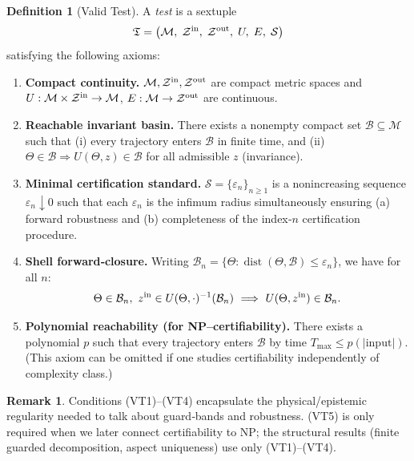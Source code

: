 \documentclass[12pt]{article}
\theoremstyle{definition}
\newtheorem{definition}{Definition}[section]
\newtheorem{remark}{Remark}[section]
\theoremstyle{plain}
\begin{document}
\begin{definition}[Valid Test]
\label{def:valid-test}
A \emph{test} is a sextuple
\[
  \mathfrak T = \bigl(\mathcal M,\;\mathcal Z^{\rm in},\;\mathcal Z^{\rm out},\;U,\;E,\;\mathcal S\bigr)
\]
satisfying the following axioms:

\begin{enumerate}[label=(VT\arabic*)]
  \item \textbf{Compact continuity.} 
        $\mathcal M,\mathcal Z^{\rm in},\mathcal Z^{\rm out}$ are compact metric spaces and 
        $U:\mathcal M\times\mathcal Z^{\rm in}\to\mathcal M$, 
        $E:\mathcal M\to\mathcal Z^{\rm out}$ are continuous.

  \item \textbf{Reachable invariant basin.}
        There exists a nonempty compact set $\mathcal B\subseteq\mathcal M$ such that
        (i) every trajectory enters $\mathcal B$ in finite time, and
        (ii) $\Theta\in\mathcal B \Rightarrow U(\Theta,z)\in\mathcal B$ for all admissible $z$ (invariance).

  \item \textbf{Minimal certification standard.}
        $\mathcal S=\{\varepsilon_n\}_{n\ge1}$ is a nonincreasing sequence $\varepsilon_n\downarrow0$ such that each
        $\varepsilon_n$ is the infimum radius simultaneously ensuring (a) forward robustness and (b) completeness of the index‑$n$ certification procedure.

  \item \textbf{Shell forward‑closure.}
        Writing $\mathcal B_n=\{\Theta:\operatorname{dist}(\Theta,\mathcal B)\le\varepsilon_n\}$,
        we have for all $n$:
        \[
          \Theta\in\mathcal B_n,\ z^{\rm in}\in U(\Theta,\cdot)^{-1}(\mathcal B_n)
          \ \Longrightarrow\ 
          U(\Theta,z^{\rm in})\in\mathcal B_n.
        \]

  \item \textbf{Polynomial reachability (for NP–certifiability).}
        There exists a polynomial $p$ such that every trajectory enters $\mathcal B$ by time
        $T_{\max}\le p(\lvert\text{input}\rvert)$.  (This axiom can be omitted if one studies certifiability independently of complexity class.)
\end{enumerate}
\end{definition}

\begin{remark}
Conditions (VT1)–(VT4) encapsulate the physical/epistemic regularity needed to talk about guard‑bands and robustness. (VT5) is only required when we later connect certifiability to NP; the structural results (finite guarded decomposition, aspect uniqueness) use only (VT1)–(VT4).
\end{remark}
\end{document}
